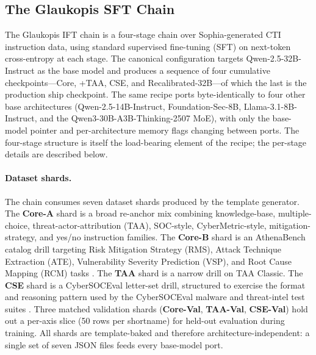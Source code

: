 \documentclass[webpdf,contemporary,large]{oup-authoring-template}
\theoremstyle{thmstyleone}
\theoremstyle{thmstyletwo}
\theoremstyle{thmstylethree}
\begin{document}
\subsection{The Glaukopis SFT Chain}
\label{sec:glaukopis-sft}

The Glaukopis IFT chain is a four-stage chain over Sophia-generated CTI instruction data, using standard supervised fine-tuning (SFT) on next-token cross-entropy at each stage. The canonical configuration targets Qwen-2.5-32B-Instruct as the base model and produces a sequence of four cumulative checkpoints---Core, +TAA, CSE, and Recalibrated-32B---of which the last is the production ship checkpoint. The same recipe ports byte-identically to four other base architectures (Qwen-2.5-14B-Instruct, Foundation-Sec-8B, Llama-3.1-8B-Instruct, and the Qwen3-30B-A3B-Thinking-2507 MoE), with only the base-model pointer and per-architecture memory flags changing between ports. The four-stage structure is itself the load-bearing element of the recipe; the per-stage details are described below.

\paragraph{Dataset shards.}
The chain consumes seven dataset shards produced by the template generator. The \textbf{Core-A} shard is a broad re-anchor mix combining knowledge-base, multiple-choice, threat-actor-attribution (TAA), SOC-style, CyberMetric-style, mitigation-strategy, and yes/no instruction families. The \textbf{Core-B} shard is an AthenaBench catalog drill targeting Risk Mitigation Strategy (RMS), Attack Technique Extraction (ATE), Vulnerability Severity Prediction (VSP), and Root Cause Mapping (RCM) tasks \cite{alam2025athenabench}. The \textbf{TAA} shard is a narrow drill on TAA Classic. The \textbf{CSE} shard is a CyberSOCEval letter-set drill, structured to exercise the format and reasoning pattern used by the CyberSOCEval malware and threat-intel test suites \cite{cybersoceval2025}. Three matched validation shards (\textbf{Core-Val}, \textbf{TAA-Val}, \textbf{CSE-Val}) hold out a per-axis slice (50 rows per shortname) for held-out evaluation during training. All shards are template-baked and therefore architecture-independent: a single set of seven JSON files feeds every base-model port.
\end{document}

